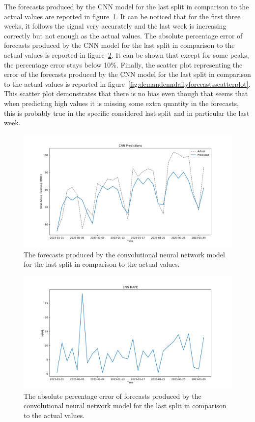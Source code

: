 The forecasts produced by the CNN model for the last split in comparison to the actual values are reported in figure~\ref{fig:demandcnndailyforecasts}.
It can be noticed that for the first three weeks, it follows the signal very accurately and the last week is increasing correctly but not enough as the actual values.
The absolute percentage error of forecasts produced by the CNN model for the last split in comparison to the actual values is reported in figure~\ref{fig:demandcnndailyforecastsmape}.
It can be shown that except for some peaks, the percentage error stays below 10\%.
Finally, the scatter plot representing the error of the forecasts produced by the CNN model for the last split in comparison to the actual values is reported in figure~\ref{fig:demandcnndailyforecastsscatterplot}.
This scatter plot demonstrates that there is no bias even though that seems that when predicting high values it is missing some extra quantity in the forecasts, this is probably true in the specific considered last split and in particular the last week.

\begin{figure}[H]
\centering
\includegraphics[width=1\textwidth]{images/demand/CNN_daily_aggregated}
\caption{The forecasts produced by the convolutional neural network model for the last split in comparison to the actual values.}
\label{fig:demandcnndailyforecasts}
\end{figure}

\begin{figure}[H]
\centering
\includegraphics[width=1\textwidth]{images/demand/CNN_daily_aggregated_mape}
\caption{The absolute percentage error of forecasts produced by the convolutional neural network model for the last split in comparison to the actual values.}
\label{fig:demandcnndailyforecastsmape}
\end{figure}

